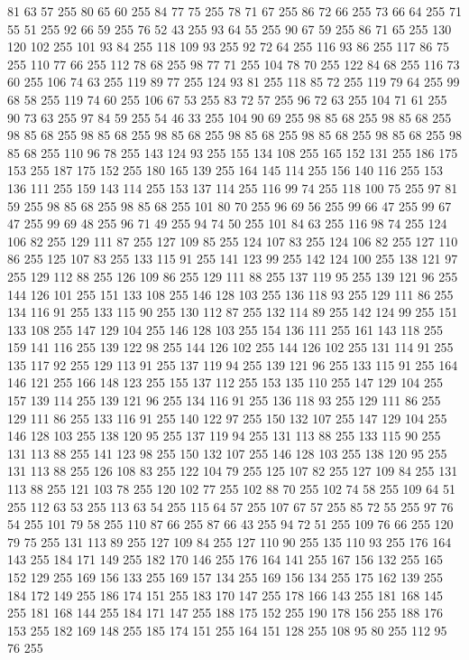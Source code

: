 81 63 57 255 80 65 60 255 84 77 75 255 78 71 67 255 86 72 66 255 73 66 64 255 71 55 51 255 92 66 59 255 76 52 43 255 93 64 55 255 90 67 59 255 86 71 65 255 130 120 102 255 101 93 84 255 118 109 93 255 92 72 64 255 116 93 86 255 117 86 75 255 110 77 66 255 112 78 68 255 98 77 71 255 104 78 70 255 122 84 68 255 116 73 60 255 106 74 63 255 119 89 77 255 124 93 81 255 118 85 72 255 119 79 64 255 99 68 58 255 119 74 60 255 106 67 53 255 83 72 57 255 96 72 63 255 104 71 61 255 90 73 63 255 97 84 59 255 54 46 33 255 104 90 69 255 98 85 68 255 98 85 68 255 98 85 68 255 98 85 68 255 98 85 68 255 98 85 68 255 98 85 68 255 98 85 68 255 98 85 68 255 110 96 78 255 143 124 93 255 155 134 108 255 165 152 131 255 186 175 153 255 187 175 152 255 180 165 139 255 164 145 114 255 156 140 116 255 153 136 111 255 159 143 114 255 153 137 114 255 116 99 74 255 118 100 75 255 97 81 59 255 98 85 68 255
98 85 68 255 101 80 70 255 96 69 56 255 99 66 47 255 99 67 47 255 99 69 48 255 96 71 49 255 94 74 50 255 101 84 63 255 116 98 74 255 124 106 82 255 129 111 87 255 127 109 85 255 124 107 83 255 124 106 82 255 127 110 86 255 125 107 83 255 133 115 91 255 141 123 99 255 142 124 100 255 138 121 97 255 129 112 88 255 126 109 86 255 129 111 88 255 137 119 95 255 139 121 96 255 144 126 101 255 151 133 108 255 146 128 103 255 136 118 93 255 129 111 86 255 134 116 91 255 133 115 90 255 130 112 87 255 132 114 89 255 142 124 99 255 151 133 108 255 147 129 104 255 146 128 103 255 154 136 111 255 161 143 118 255 159 141 116 255 139 122 98 255 144 126 102 255 144 126 102 255 131 114 91 255 135 117 92 255 129 113 91 255 137 119 94 255 139 121 96 255 133 115 91 255 164 146 121 255 166 148 123 255 155 137 112 255 153 135 110 255 147 129 104 255 157 139 114 255 139 121 96 255 134 116 91 255 136 118 93 255 129 111 86 255 129 111 86 255 133 116 91 255 140 122 97 255
150 132 107 255 147 129 104 255 146 128 103 255 138 120 95 255 137 119 94 255 131 113 88 255 133 115 90 255 131 113 88 255 141 123 98 255 150 132 107 255 146 128 103 255 138 120 95 255 131 113 88 255 126 108 83 255 122 104 79 255 125 107 82 255 127 109 84 255 131 113 88 255 121 103 78 255 120 102 77 255 102 88 70 255 102 74 58 255 109 64 51 255 112 63 53 255 113 63 54 255 115 64 57 255 107 67 57 255 85 72 55 255 97 76 54 255 101 79 58 255 110 87 66 255 87 66 43 255 94 72 51 255 109 76 66 255 120 79 75 255 131 113 89 255 127 109 84 255 127 110 90 255 135 110 93 255 176 164 143 255 184 171 149 255 182 170 146 255 176 164 141 255 167 156 132 255 165 152 129 255 169 156 133 255 169 157 134 255 169 156 134 255 175 162 139 255 184 172 149 255 186 174 151 255 183 170 147 255 178 166 143 255 181 168 145 255 181 168 144 255 184 171 147 255 188 175 152 255 190 178 156 255 188 176 153 255 182 169 148 255 185 174 151 255 164 151 128 255 108 95 80 255 112 95 76 255
